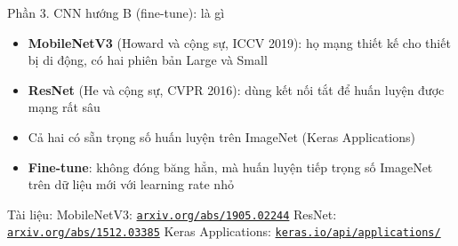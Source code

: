 \documentclass[aspectratio=169,10pt]{beamer}
\begin{document}
\begin{frame}{Phần 3. CNN hướng B (fine-tune): là gì}
\begin{itemize}
\item \textbf{MobileNetV3} (Howard và cộng sự, ICCV 2019): họ mạng thiết kế cho thiết bị di động, có hai phiên bản Large và Small
\item \textbf{ResNet} (He và cộng sự, CVPR 2016): dùng kết nối tắt để huấn luyện được mạng rất sâu
\item Cả hai có sẵn trọng số huấn luyện trên ImageNet (Keras Applications)
\item \textbf{Fine-tune}: không đóng băng hẳn, mà huấn luyện tiếp trọng số ImageNet trên dữ liệu mới với learning rate nhỏ
\end{itemize}
\vfill{\scriptsize\color{uitgray}Tài liệu: MobileNetV3: \href{https://arxiv.org/abs/1905.02244}{\texttt{arxiv.org/abs/1905.02244}} \textbar{} ResNet: \href{https://arxiv.org/abs/1512.03385}{\texttt{arxiv.org/abs/1512.03385}} \textbar{} Keras Applications: \href{https://keras.io/api/applications/}{\texttt{keras.io/api/applications/}}}
\end{frame}
\end{document}
